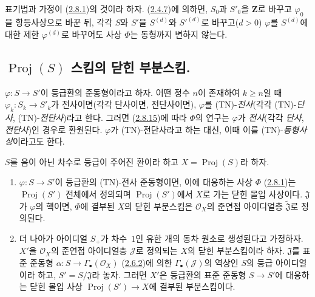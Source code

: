 
\begin{env}[2.8.15]
\label{II.2.8.15-ko}
표기법과 가정이 (\hyperref[II.2.8.1-ko]{2.8.1})의 것이라 하자.
(\hyperref[II.2.4.7-ko]{2.4.7})에 의하면, $S_0$과 $S'_0$을
$\mathbf{Z}$로 바꾸고 $\varphi_0$을 항등사상으로 바꾼 뒤, 각각 $S$와
$S'$을 $S^{(d)}$와 ${S'}^{(d)}$로 바꾸고($d>0$) $\varphi$를
$S^{(d)}$에 대한 제한 $\varphi^{(d)}$로 바꾸어도 사상 $\Phi$는 동형까지
변하지 않는다.
\end{env}

\subsection{$\operatorname{Proj}(S)$ 스킴의 닫힌 부분스킴.}
\label{subsection:II.2.9-ko}

\begin{env}[2.9.1]
\label{II.2.9.1-ko}
$\varphi:S\to S'$이 등급환의 준동형이라고 하자. 어떤 정수 $n$이 존재하여
$k\geq n$일 때 $\varphi_k:S_k\to S'_k$가 전사이면(각각 단사이면,
전단사이면), $\varphi$를 (TN)-\emph{전사}(각각 (TN)-\emph{단사},
(TN)-\emph{전단사})라고 한다. 그러면
(\hyperref[II.2.8.15-ko]{2.8.15})에 따라 $\Phi$의 연구는 $\varphi$가
\emph{전사}(각각 \emph{단사}, \emph{전단사})인 경우로 환원된다.
$\varphi$가 (TN)-전단사라고 하는 대신, 이때 이를
(TN)-\emph{동형사상}이라고도 한다.
\end{env}

\begin{proposition}[2.9.2]
\label{II.2.9.2-ko}
$S$를 음이 아닌 차수로 등급이 주어진 환이라 하고
$X=\operatorname{Proj}(S)$라 하자.
\begin{enumerate}
  \item[\rm(i)] $\varphi:S\to S'$이 등급환의 (TN)-전사 준동형이면, 이에
    대응하는 사상 $\Phi$ (\hyperref[II.2.8.1-ko]{2.8.1})는
    $\operatorname{Proj}(S')$ 전체에서 정의되며
    $\operatorname{Proj}(S')$에서 $X$로 가는 닫힌 몰입 사상이다.
    $\mathfrak{J}$가 $\varphi$의 핵이면, $\Phi$에 결부된 $X$의 닫힌
    부분스킴은 $\mathcal{O}_X$의 준연접 아이디얼층
    $\widetilde{\mathfrak{J}}$로 정의된다.
  \item[\rm(ii)] 더 나아가 아이디얼 $S_+$가 차수~$1$인 유한 개의 동차
    원소로 생성된다고 가정하자. $X'$을 $\mathcal{O}_X$의 준연접
    아이디얼층 $\mathcal{J}$로 정의되는 $X$의 닫힌 부분스킴이라 하자.
    $\mathfrak{J}$를 표준 준동형
    $\alpha:S\to\Gamma_\bullet(\mathcal{O}_X)$
    (\hyperref[II.2.6.2-ko]{2.6.2})에 의한
    $\Gamma_\bullet(\mathcal{J})$의 역상인 $S$의 등급 아이디얼이라 하고,
    $S'=S/\mathfrak{J}$라 놓자. 그러면 $X'$은 등급환의 표준 준동형
    $S\to S'$에 대응하는 닫힌 몰입 사상
    $\operatorname{Proj}(S')\to X$에 결부된 부분스킴이다.
\end{enumerate}
\end{proposition}

